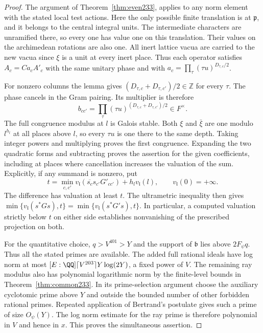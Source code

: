 \documentclass[a4paper,11pt]{article}
\theoremstyle{definition}
\theoremstyle{remark}
\newcommand{\ZZ}{\mathbb Z}\newcommand{\ord}{\operatorname{ord}}
\numberwithin{equation}{section}
\begin{document}
\begin{proof}
The argument of Theorem~\ref{thm:even233}, applies to
any norm element with the stated local test actions. Here the only
possible finite translation is at \(\mathfrak p\), and it belongs
to the central integral units. The intermediate characters are
unramified there, so every one has value one on this translation.
Their values on the archimedean rotations are also one. All inert
lattice vacua are carried to the new vacua since \(\xi\) is a unit
at every inert place. Thus each operator satisfies \(A_c=C a_c A'_c\)
with the same unitary phase and with
\(a_c=\prod_\tau(\tau u)^{D_{\tau,c}/2}\).

For nonzero columns the lemma gives
\((D_{\tau,c}+D_{\tau,c'})/2\in\ZZ\) for every \(\tau\). The phase
cancels in the Gram pairing. Its multiplier is therefore
\[
  b_{cc'}=\prod_\tau(\tau u)^{(D_{\tau,c}+D_{\tau,c'})/2}\in F^\times.
\]
The full congruence modulus at \(l\) is Galois stable. Both \(\xi\)
and \(\bar\xi\) are one modulo \(l^{h_l}\) at all places above
\(l\), so every \(\tau u\) is one there to the same depth. Taking
integer powers and multiplying proves the first congruence. Expanding
the two quadratic forms and subtracting proves the assertion for
the given coefficients, including at places where cancellation
increases the valuation of the sum. Explicitly, if any summand is
nonzero, put
\[
 t=\min_{c,c'}v_{\mathfrak l}(\overline{s_c}s_{c'}G'_{cc'})
              +h_l v_{\mathfrak l}(l),
 \qquad v_{\mathfrak l}(0)=+\infty .
\]
The difference has valuation at least \(t\). The ultrametric
inequality then gives
\(\min\{v_{\mathfrak l}(s^*G s),t\}
  =\min\{v_{\mathfrak l}(s^*G's),t\}\).
In particular, a computed valuation strictly below \(t\) on either
side establishes nonvanishing of the prescribed projection on both.

For the quantitative choice, \(q>V^{401}>Y\) and the support of
\(\mathfrak b\) lies above \(2F_\psi q\). Thus all the stated primes
are available. The added full rational ideals have log norm at most
\([E:\QQ]\lceil V^{203}\rceil Y\log(2Y)\), a fixed power of \(V\).
The remaining ray modulus also has polynomial logarithmic norm by
the finite-level bounds in Theorem~\ref{thm:common233}.
In its prime-selection argument choose the auxiliary cyclotomic
prime above \(Y\) and outside the bounded number of other forbidden
rational primes. Repeated application of Bertrand's postulate gives
such a prime of size \(O_\psi(Y)\). The log norm estimate for the
ray prime is therefore polynomial in \(V\) and hence in \(x\).
This proves the simultaneous assertion.
\end{proof}
\end{document}
